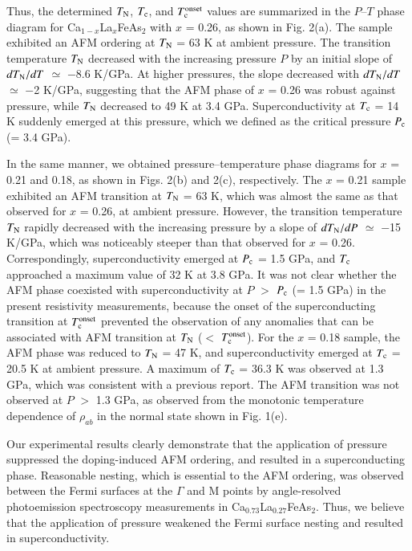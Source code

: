 \documentclass [letter,twocolumn]{jpsj3}
\begin{document}
Thus, the determined $T_{\rm N}$, $T_{\rm c}$, and $T_{\rm c}^{\rm onset}$ values are summarized in the $P$--$T$ phase diagram for Ca$_{1-x}$La$_{x}$FeAs$_{2}$ with $x$ = 0.26, as shown in Fig. 2(a). 
The sample exhibited an AFM ordering at $T_{\rm N}$ = 63 K at ambient pressure. 
The transition temperature $T_{\rm N}$ decreased with the increasing pressure $P$ by an initial slope of $dT_{\rm N}/dT$ $\simeq$ $-$8.6 K/GPa. 
At higher pressures, the slope decreased with $dT_{\rm N}/dT$ $\simeq$ $-$2 K/GPa, suggesting that the AFM phase of $x$ = 0.26 was robust against pressure, while $T_{\rm N}$ decreased to 49 K at 3.4 GPa. 
Superconductivity at $T_{\rm c}$ = 14 K suddenly emerged at this pressure, which we defined as the critical pressure $P_{\rm c}$ (= 3.4 GPa). 

In the same manner, we obtained pressure--temperature phase diagrams for $x$ = 0.21 and 0.18, as shown in Figs. 2(b) and 2(c), respectively. 
The $x$ = 0.21 sample exhibited an AFM transition at $T_{\rm N}$ = 63 K, which was almost the same as that observed for $x$ = 0.26, at ambient pressure. 
However, the transition temperature $T_{\rm N}$ rapidly decreased with the increasing pressure by a slope of $dT_{\rm N}/dP$ $\simeq$ $-$15 K/GPa, which was noticeably steeper than that observed for  $x$ = 0.26. 
Correspondingly, superconductivity emerged at $P_{\rm c}$ = 1.5 GPa, and $T_{\rm c}$ approached a maximum value of 32 K at 3.8 GPa. 
It was not clear whether the AFM phase coexisted with superconductivity at $P$ $>$ $P_{\rm c}$ (= 1.5 GPa) in the present resistivity measurements, because the onset of the superconducting transition at $T_{\rm c}^{\rm onset}$ prevented the observation of any anomalies that can be associated with AFM transition at $T_{\rm N}$ ($<$ $T_{\rm c}^{\rm onset}$). 
%
For the $x$ = 0.18 sample, 
the AFM phase was reduced to $T_{\rm N}$ = 47 K, and superconductivity emerged at $T_{\rm c}$ = 20.5 K at ambient pressure. 
A maximum of $T_{\rm c}$ = 36.3 K was observed at 1.3 GPa, which was consistent with a previous report. \cite{W.Zhou_EPL_2015} 
The AFM transition was not observed at $P$ $>$ 1.3 GPa, as  observed from the monotonic temperature dependence of $\rho_{ab}$ in the normal state shown in Fig. 1(e). 


Our experimental results clearly demonstrate that the application of pressure suppressed the doping-induced AFM ordering, and resulted in a superconducting phase.
Reasonable nesting, which is essential to the AFM ordering, was observed between the Fermi surfaces at the $\Gamma$ and M points by angle-resolved photoemission spectroscopy measurements in Ca$_{0.73}$La$_{0.27}$FeAs$_{2}$. \cite{S.Jiang_PRB_2016}
Thus, we believe that the application of pressure weakened the Fermi surface nesting and resulted in superconductivity. 
\end{document}
